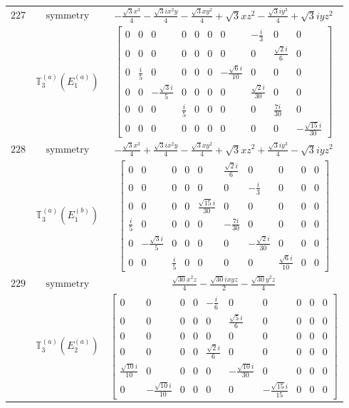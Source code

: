 \documentclass[fleqn,8pt,landscape]{jsarticle}
\begin{document}
\begin{longtable}{ccc}
$ 227 $ & $ \text{symmetry} $ & $ - \frac{\sqrt{3} x^{3}}{4} - \frac{\sqrt{3} i x^{2} y}{4} - \frac{\sqrt{3} x y^{2}}{4} + \sqrt{3} x z^{2} - \frac{\sqrt{3} i y^{3}}{4} + \sqrt{3} i y z^{2} $ \\
$  $ & $ \mathbb{T}_{3}^{(a)}(E_{1}^{(a)}) $ & $ \begin{bmatrix} 0 & 0 & 0 & 0 & 0 & 0 & 0 & - \frac{i}{3} & 0 & 0 \\ 0 & 0 & 0 & 0 & 0 & 0 & 0 & 0 & \frac{\sqrt{2} i}{6} & 0 \\ 0 & \frac{i}{5} & 0 & 0 & 0 & 0 & - \frac{\sqrt{6} i}{10} & 0 & 0 & 0 \\ 0 & 0 & - \frac{\sqrt{3} i}{5} & 0 & 0 & 0 & 0 & \frac{\sqrt{2} i}{30} & 0 & 0 \\ 0 & 0 & 0 & \frac{i}{5} & 0 & 0 & 0 & 0 & \frac{7 i}{30} & 0 \\ 0 & 0 & 0 & 0 & 0 & 0 & 0 & 0 & 0 & - \frac{\sqrt{15} i}{30} \end{bmatrix} $ \\ \hline
$ 228 $ & $ \text{symmetry} $ & $ - \frac{\sqrt{3} x^{3}}{4} + \frac{\sqrt{3} i x^{2} y}{4} - \frac{\sqrt{3} x y^{2}}{4} + \sqrt{3} x z^{2} + \frac{\sqrt{3} i y^{3}}{4} - \sqrt{3} i y z^{2} $ \\
$  $ & $ \mathbb{T}_{3}^{(a)}(E_{1}^{(b)}) $ & $ \begin{bmatrix} 0 & 0 & 0 & 0 & 0 & \frac{\sqrt{2} i}{6} & 0 & 0 & 0 & 0 \\ 0 & 0 & 0 & 0 & 0 & 0 & - \frac{i}{3} & 0 & 0 & 0 \\ 0 & 0 & 0 & 0 & \frac{\sqrt{15} i}{30} & 0 & 0 & 0 & 0 & 0 \\ \frac{i}{5} & 0 & 0 & 0 & 0 & - \frac{7 i}{30} & 0 & 0 & 0 & 0 \\ 0 & - \frac{\sqrt{3} i}{5} & 0 & 0 & 0 & 0 & - \frac{\sqrt{2} i}{30} & 0 & 0 & 0 \\ 0 & 0 & \frac{i}{5} & 0 & 0 & 0 & 0 & \frac{\sqrt{6} i}{10} & 0 & 0 \end{bmatrix} $ \\ \hline
$ 229 $ & $ \text{symmetry} $ & $ \frac{\sqrt{30} x^{2} z}{4} - \frac{\sqrt{30} i x y z}{2} - \frac{\sqrt{30} y^{2} z}{4} $ \\
$  $ & $ \mathbb{T}_{3}^{(a)}(E_{2}^{(a)}) $ & $ \begin{bmatrix} 0 & 0 & 0 & 0 & - \frac{i}{6} & 0 & 0 & 0 & 0 & 0 \\ 0 & 0 & 0 & 0 & 0 & \frac{\sqrt{5} i}{6} & 0 & 0 & 0 & 0 \\ 0 & 0 & 0 & 0 & 0 & 0 & 0 & 0 & 0 & 0 \\ 0 & 0 & 0 & 0 & \frac{\sqrt{2} i}{6} & 0 & 0 & 0 & 0 & 0 \\ \frac{\sqrt{10} i}{10} & 0 & 0 & 0 & 0 & - \frac{\sqrt{10} i}{30} & 0 & 0 & 0 & 0 \\ 0 & - \frac{\sqrt{10} i}{10} & 0 & 0 & 0 & 0 & - \frac{\sqrt{15} i}{15} & 0 & 0 & 0 \end{bmatrix} $ \\ \hline

\end{longtable}
\end{document}
